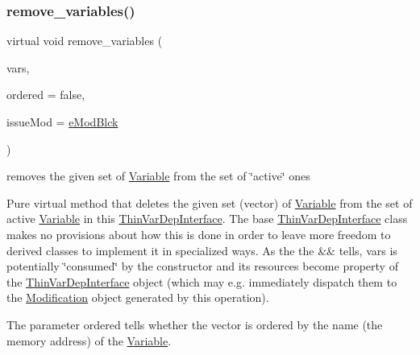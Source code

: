 \subsubsection{\texorpdfstring{remove\+\_\+variables()}{remove\_variables()}}
{\footnotesize\ttfamily virtual void remove\+\_\+variables (\begin{DoxyParamCaption}\item[{std\+::vector$<$ \mbox{\hyperlink{class_s_m_spp__di__unipi__it_1_1_variable}{Variable}} $\ast$$>$ \&\&}]{vars,  }\item[{const bool}]{ordered = {\ttfamily false},  }\item[{\mbox{\hyperlink{group___modification___t_y_p_e_s_ga544246d8c462e9a2d817c2c30797968f}{c\+\_\+\+Mod\+Param}}}]{issue\+Mod = {\ttfamily \mbox{\hyperlink{group___modification___t_y_p_e_s_gga48fddcdd03a03f49b7e389ca1ed938d4a21b14b26b1c0093a0905f6fc010bad29}{e\+Mod\+Blck}}} }\end{DoxyParamCaption})\hspace{0.3cm}{\ttfamily [pure virtual]}}



removes the given set of \mbox{\hyperlink{class_s_m_spp__di__unipi__it_1_1_variable}{Variable}} from the set of \char`\"{}active\char`\"{} ones 

Pure virtual method that deletes the given set (vector) of \mbox{\hyperlink{class_s_m_spp__di__unipi__it_1_1_variable}{Variable}} from the set of active \mbox{\hyperlink{class_s_m_spp__di__unipi__it_1_1_variable}{Variable}} in this \mbox{\hyperlink{class_s_m_spp__di__unipi__it_1_1_thin_var_dep_interface}{Thin\+Var\+Dep\+Interface}}. The base \mbox{\hyperlink{class_s_m_spp__di__unipi__it_1_1_thin_var_dep_interface}{Thin\+Var\+Dep\+Interface}} class makes no provisions about how this is done in order to leave more freedom to derived classes to implement it in specialized ways. As the the \&\& tells, vars is potentially \char`\"{}consumed\char`\"{} by the constructor and its resources become property of the \mbox{\hyperlink{class_s_m_spp__di__unipi__it_1_1_thin_var_dep_interface}{Thin\+Var\+Dep\+Interface}} object (which may e.\+g. immediately dispatch them to the \mbox{\hyperlink{class_s_m_spp__di__unipi__it_1_1_modification}{Modification}} object generated by this operation).

The parameter ordered tells whether the vector is ordered by the name (the memory address) of the \mbox{\hyperlink{class_s_m_spp__di__unipi__it_1_1_variable}{Variable}}.

